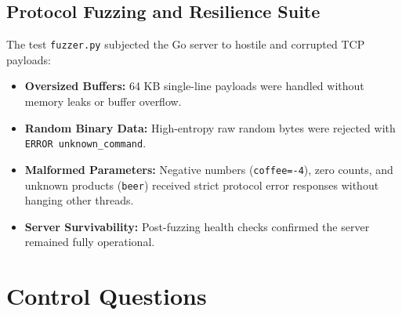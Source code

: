 \documentclass{labreport}
\begin{document}
\subsection{Protocol Fuzzing and Resilience Suite}
The test \texttt{fuzzer.py} subjected the Go server to hostile and corrupted TCP payloads:
\begin{itemize}
    \item \textbf{Oversized Buffers:} 64 KB single-line payloads were handled without memory leaks or buffer overflow.
    \item \textbf{Random Binary Data:} High-entropy raw random bytes were rejected with \texttt{ERROR unknown\_command}.
    \item \textbf{Malformed Parameters:} Negative numbers (\texttt{coffee=-4}), zero counts, and unknown products (\texttt{beer}) received strict protocol error responses without hanging other threads.
    \item \textbf{Server Survivability:} Post-fuzzing health checks confirmed the server remained fully operational.
\end{itemize}

\newpage

\section{Control Questions}
\end{document}
